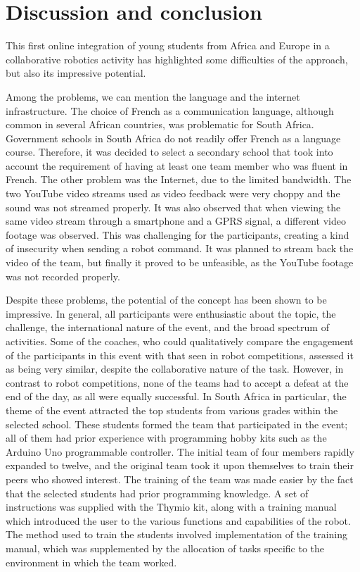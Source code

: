 \documentclass{intech-journal}
\begin{document}
\section{Discussion and conclusion}

This first online integration of young students from Africa and Europe in a collaborative robotics activity has highlighted some difficulties of the approach, but also its impressive potential.

Among the problems, we can mention the language and the internet infrastructure.
The choice of French as a communication language, although common in several African countries, was problematic for South Africa.
Government schools in South Africa do not readily offer French as a language course.
Therefore, it was decided to select a secondary school that took into account the requirement of having at least one team member who was fluent in French. 
The other problem was the Internet, due to the limited bandwidth. 
The two YouTube video streams used as video feedback were very choppy and the sound was not streamed properly.
It was also observed that when viewing the same video stream through a smartphone and a GPRS signal, a different video footage was observed. 
This was challenging for the participants, creating a kind of insecurity when sending a robot command.
It was planned to stream back the video of the team, but finally it proved to be unfeasible, as the YouTube footage was not recorded properly.

Despite these problems, the potential of the concept has been shown to be impressive.
In general, all participants were enthusiastic about the topic, the challenge, the international nature of the event, and the broad spectrum of activities. 
Some of the coaches, who could qualitatively compare the engagement of the participants in this event with that seen in robot competitions, assessed it as being very similar, despite the collaborative nature of the task. 
However, in contrast to robot competitions, none of the teams had to accept a defeat at the end of the day, as all were equally successful. 
In South Africa in particular, the theme of the event attracted the top students from various grades within the selected school. 
These students formed the team that participated in the event; all of them had prior experience with programming hobby kits such as the Arduino Uno programmable controller. 
The initial team of four members rapidly expanded to twelve, and the original team took it upon themselves to train their peers who showed interest. 
The training of the team was made easier by the fact that the selected students had prior programming knowledge. 
A set of instructions was supplied with the Thymio kit, along with a training manual which introduced the user to the various functions and capabilities of the robot. 
The method used to train the students involved implementation of the training manual, which was supplemented by the allocation of tasks specific to the environment in which the team worked. 
\end{document}
